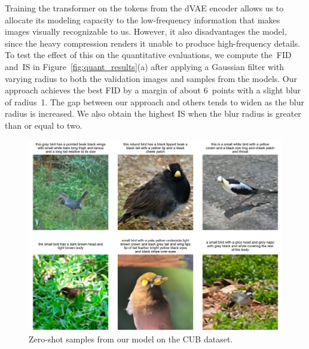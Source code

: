 \documentclass{article}
\begin{document}
Training the transformer on the tokens from the dVAE encoder allows us to allocate its modeling capacity to the low-frequency information that makes images visually recognizable to us. However, it also disadvantages the model, since the heavy compression renders it unable to produce high-frequency details. To test the effect of this on the quantitative evaluations, we compute the~FID and~IS in Figure~\ref{fig:quant_results}(a) after applying a Gaussian filter with varying radius to both the validation images and samples from the models. Our approach achieves the best FID by a margin of about 6~points with a slight blur of radius~1. The gap between our approach and others tends to widen as the blur radius is increased. We also obtain the highest IS when the blur radius is greater than or equal to two.
%
\begin{figure}[t]
    \centering
    \includegraphics[width=\linewidth]{cub_samples.jpg}
    \caption{Zero-shot samples from our model on the CUB dataset.}
    \label{fig:cub_samples}
    \vspace{-1em}
\end{figure}
%
\end{document}
